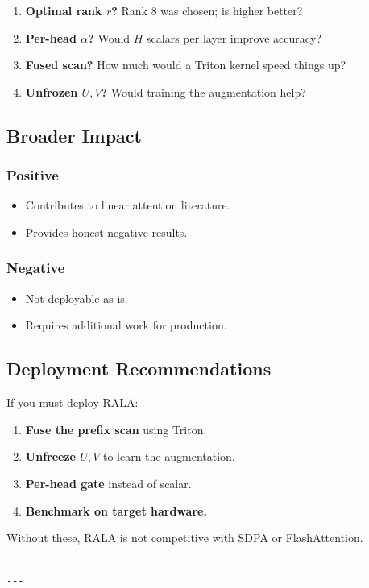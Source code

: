 \begin{enumerate}
\item \textbf{Optimal rank $r$?} Rank 8 was chosen; is higher better?
\item \textbf{Per-head $\alpha$?} Would $H$ scalars per layer improve accuracy?
\item \textbf{Fused scan?} How much would a Triton kernel speed things up?
\item \textbf{Unfrozen $U, V$?} Would training the augmentation help?

\end{enumerate}
\subsection{Broader Impact}

\subsubsection{Positive}

\begin{itemize}
\item Contributes to linear attention literature.
\item Provides honest negative results.

\end{itemize}
\subsubsection{Negative}

\begin{itemize}
\item Not deployable as-is.
\item Requires additional work for production.

\end{itemize}
\subsection{Deployment Recommendations}

If you must deploy RALA:

\begin{enumerate}
\item \textbf{Fuse the prefix scan} using Triton.
\item \textbf{Unfreeze $U, V$} to learn the augmentation.
\item \textbf{Per-head gate} instead of scalar.
\item \textbf{Benchmark on target hardware.}

\end{enumerate}
Without these, RALA is not competitive with SDPA or FlashAttention.
\begin{lstlisting}

---
\end{lstlisting}